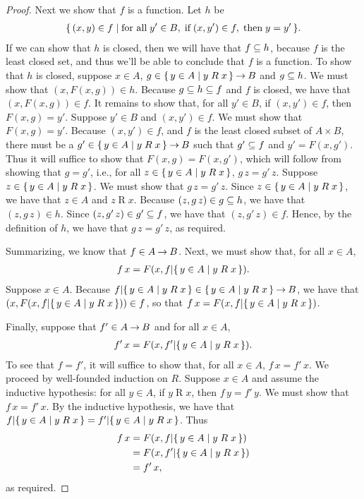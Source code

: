 \begin{proof}
Next we show that $f$ is a function.  Let $h$ be
\begin{gather*}
\{ \, (x,y)\in f \mid \allowbreak\mbox{for all}\allowbreak\;y'\in B,\;\allowbreak\mbox{if}\allowbreak\;(x,y')\in f,
\;\allowbreak\mbox{then}\allowbreak\; y = y' \, \} .
\end{gather*}
If we can show that $h$ is closed, then we will have that $f\subseteq h$,
because $f$ is the least closed set, and thus we'll be able to
conclude that $f$ is a function.  To show that $h$ is closed, suppose
$x\in A$, $g\in\{ \, y\in A \mid y\mathrel{R}x \, \}\mathbin{\to} B$ and $g\subseteq h$.  We
must show that $(x, F(x, g))\in h$. Because $g\subseteq h\subseteq f$ and $f$ is
closed, we have that $(x, F(x, g))\in f$.  It remains to show that,
for all $y'\in B$, if $(x,y')\in f$, then $F(x, g) = y'$.  Suppose
$y'\in B$ and $(x,y')\in f$.  We must show that $F(x, g) = y'$.
Because $(x,y')\in f$, and $f$ is the least closed subset of
$A\times B$, there must be a
$g'\in \{ \, y\in A \mid y\mathrel{R}x \, \}\mathbin{\to} B$ such that $g'\subseteq f$ and
$y'=F(x, g')$.  Thus it will suffice to show that $F(x,g) = F(x, g')$,
which will follow from showing that $g=g'$, i.e., for all
$z\in\{ \, y\in A \mid y\mathrel{R}x \, \}$, $g\,z=g'\,z$.  Suppose
$z\in\{ \, y\in A \mid y\mathrel{R}x \, \}$.  We must show that $g\,z=g'\,z$.
Since $z\in\{ \, y\in A \mid y\mathrel{R}x \, \}$, we have that $z\in A$ and
$z\mathrel{R}x$.  Because $(z,g\,z)\in g\subseteq h$, we have that
$(z,g\,z)\in h$.  Since $(z,g'\,z)\in g'\subseteq f$, we have that
$(z,g'\,z)\in f$.  Hence, by the definition of $h$, we have that
$g\,z=g'\,z$, as required.

Summarizing, we know that $f\in A\mathbin{\to} B$.  Next, we must show that,
for all $x\in A$,
\begin{gather*}
f\,x = F(x, f\mathord{\mid}\{ \, y\in A \mid y\mathrel{R}x \, \}) .
\end{gather*}
Suppose $x\in A$.  Because $f\mathord{\mid}\{ \, y\in A \mid y\mathrel{R}x \, \}\in
\{ \, y\in A \mid y\mathrel{R}x \, \}\mathbin{\to} B$, we have that
$(x,F(x,f\mathord{\mid}\{ \, y\in A \mid y\mathrel{R}x \, \}))\in f$, so that
$f\,x = F(x, f\mathord{\mid}\{ \, y\in A \mid y\mathrel{R}x \, \})$.

Finally, suppose that $f'\in A\mathbin{\to} B$ and
for all $x\in A$,
\begin{gather*}
f'\,x = F(x, f'\mathord{\mid}\{ \, y\in A \mid y\mathrel{R}x \, \}) .
\end{gather*}
To see that $f=f'$, it will suffice to show that, for all
$x\in A$, $f\,x=f'\,x$.  We proceed by well-founded induction
on $R$.  Suppose $x\in A$ and assume the inductive hypothesis:
for all $y\in A$, if $y\mathrel{R}x$, then $f\,y=f'\,y$.
We must show that $f\,x=f'\,x$.  By the inductive hypothesis,
we have that $f\mathord{\mid}\{ \, y\in A \mid y\mathrel{R}x \, \} =
f'\mathord{\mid}\{ \, y\in A \mid y\mathrel{R}x \, \}$.  
Thus
\begin{align*}
f\,x &= F(x, f\mathord{\mid}\{ \, y\in A \mid y\mathrel{R}x \, \}) \\
&= F(x, f'\mathord{\mid}\{ \, y\in A \mid y\mathrel{R}x \, \}) \\
&= f'\,x ,
\end{align*}
as required.
\end{proof}

